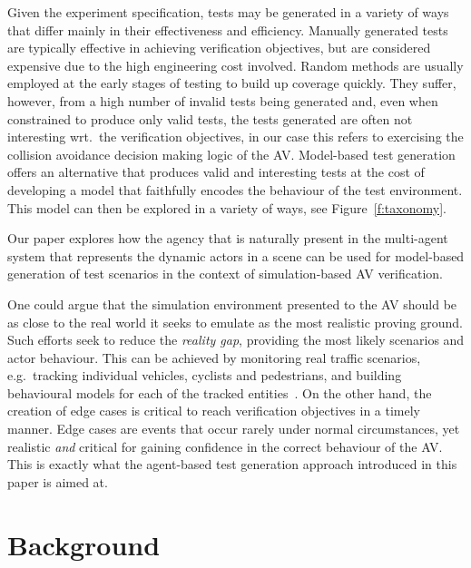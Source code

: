 \documentclass[letterpaper, 10 pt, journal, twoside]{IEEEtran}
\begin{document}
Given the experiment specification, tests may be generated in a variety of ways that differ mainly in their effectiveness and efficiency. Manually generated tests are typically effective in achieving verification objectives, but are considered expensive due to the high engineering cost involved. Random methods are usually employed at the early stages of testing to build up coverage quickly. They suffer, however, from a high number of invalid tests being generated and, even when constrained to produce only valid tests, the tests generated are often not interesting wrt.\ the verification objectives, in our case this refers to exercising the collision avoidance decision making logic of the AV. Model-based test generation offers an alternative that produces valid and interesting tests at the cost of developing a model that faithfully encodes the behaviour of the test environment. This model can then be explored in a variety of ways, see Figure~\ref{f:taxonomy}.

Our paper explores how the agency that is naturally present in the multi-agent system that represents the dynamic actors in a scene can be used for model-based generation of test scenarios in the context of simulation-based AV verification. 

One could argue that the simulation environment presented to the AV should be as close to the real world it seeks to emulate as the most realistic proving ground. Such efforts seek to reduce the \textit{reality gap}, providing the most likely scenarios and actor behaviour. This can be achieved by monitoring real traffic scenarios, e.g.\ tracking individual vehicles, cyclists and pedestrians, and building behavioural models for each of the tracked entities~\cite{behbahani2019learning}. On the other hand, the creation of edge cases is critical to reach verification objectives in a timely manner. Edge cases are events that occur rarely under normal circumstances, yet realistic \textit{and\/} critical for gaining confidence in the correct behaviour of the AV. This is exactly what the agent-based test generation approach introduced in this paper is aimed at.  

\section{Background}\label{s:background}

\end{document}

